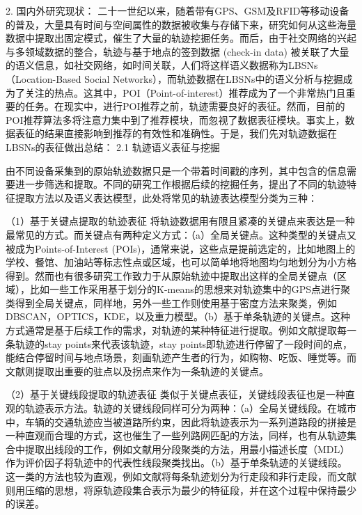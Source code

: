 \documentclass[a4paper,11pt]{article}
\theoremstyle{mytheor}
\begin{document}
2. 国内外研究现状：
二十一世纪以来，随着带有GPS、GSM及RFID等移动设备的普及，大量具有时间与空间属性的数据被收集与存储下来，研究如何从这些海量数据中提取出固定模式，催生了大量的轨迹挖掘任务。而后，由于社交网络的兴起与多领域数据的整合，轨迹与基于地点的签到数据 (check-in data) 被关联了大量的语义信息，如社交网络，如时间关联，人们将这样语义数据称为LBSNs（Location-Based Social Networks），而轨迹数据在LBSNs中的语义分析与挖掘成为了关注的热点。这其中，POI（Point-of-interest）推荐成为了一个非常热门且重要的任务。在现实中，进行POI推荐之前，轨迹需要良好的表征。然而，目前的POI推荐算法多将注意力集中到了推荐模块，而忽视了数据表征模块。事实上，数据表征的结果直接影响到推荐的有效性和准确性。于是，我们先对轨迹数据在LBSNs的表征做出总结：
2.1 轨迹语义表征与挖掘

由不同设备采集到的原始轨迹数据只是一个带着时间戳的序列，其中包含的信息需要进一步筛选和提取。不同的研究工作根据后续的挖掘任务，提出了不同的轨迹特征提取方法以及语义表达模型，此处将常见的轨迹表达模型分类为三种：

（1）基于关键点提取的轨迹表征
将轨迹数据用有限且紧凑的关键点来表达是一种最常见的方式。而关键点有两种定义方式：（a）全局关键点。这种类型的关键点又被成为Points-of-Interest (POIs)，通常来说，这些点是提前选定的，比如地图上的学校、餐馆、加油站等标志性点或区域，也可以简单地将地图均匀地划分为小方格得到\cite{giannotti2007trajectory,wei2012constructing,shang2014inferring,wang2014travel,yuan2015discovering,xue2013destination,zheng2015approximate,cho2011friendship}。然而也有很多研究工作致力于从原始轨迹中提取出这样的全局关键点（区域），比如一些工作\cite{ashbrook2002learning,ashbrook2003using}采用基于划分的K-means的思想来对轨迹集中的GPS点进行聚类得到全局关键点，同样地，另外一些工作则使用基于密度方法来聚类，例如DBSCAN，OPTICS，KDE，以及重力模型\cite{li2010mining,zheng2011recommending,jeung2008discovery,chen2011discovering,zheng2008understanding,wang2015regularity}。（b）基于单条轨迹的关键点。这种方式通常是基于后续工作的需求，对轨迹的某种特征进行提取。例如文献\cite{li2008mining,zheng2011learning}提取每一条轨迹的stay points来代表该轨迹，stay points即轨迹进行停留了一段时间的点，能结合停留时间与地点场景，刻画轨迹产生者的行为，如购物、吃饭、睡觉等。而文献\cite{adrienko2011spatial}则提取出重要的驻点以及拐点来作为一条轨迹的关键点。

（2）基于关键线段提取的轨迹表征
类似于关键点表征，关键线段表征也是一种直观的轨迹表示方法。轨迹的关键线段同样可分为两种：（a）全局关键线段。在城市中，车辆的交通轨迹应当被道路所约束，因此将轨迹表示为一系列道路段的拼接是一种直观而合理的方式，这也催生了一些列路网匹配的方法\cite{greenfeld2002matching,chen2003integrated,newson2009hidden}，同样，也有从轨迹集合中提取出线段的工作，例如文献\cite{lee2007trajectory}用分段聚类的方法，用最小描述长度（MDL）作为评价因子将轨迹中的代表性线段聚类找出。（b）基于单条轨迹的关键线段。这一类的方法也较为直观，例如文献\cite{zheng2008learning,zheng2008understanding}将每条轨迹划分为行走段和非行走段，而文献\cite{lee2011trajectory,douglas1973algorithms,bellman1961approximation} 则用压缩的思想，将原轨迹段集合表示为最少的特征段，并在这个过程中保持最少的误差。
\end{document}
